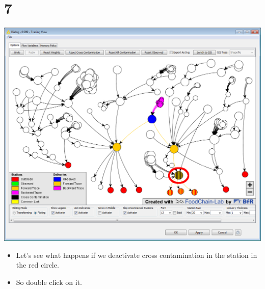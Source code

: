 \documentclass{beamer}
\begin{document}
\section{7}
\begin{frame}
	\begin{center}
  		\includegraphics[height=0.6\textheight]{7.png}
	\end{center}
	\begin{itemize}
		\item Let's see what happens if we deactivate cross contamination in the station in the red circle.
		\item So double click on it.
	\end{itemize}
\end{frame}
\end{document}

